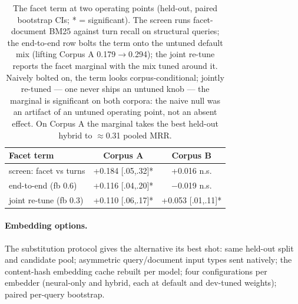 \documentclass[twocolumn,10pt]{article}
\begin{document}
\begin{table}[H]
\centering\footnotesize
\setlength{\tabcolsep}{4pt}
\begin{tabular}{@{}lcc@{}}
\toprule
\textbf{Facet term} & \textbf{Corpus A} & \textbf{Corpus B}\\
\midrule
screen: facet vs turns & +0.184 [.05,.32]* & +0.016 n.s.\\
end-to-end (fb 0.6) & +0.116 [.04,.20]* & $-$0.019 n.s.\\
joint re-tune (fb 0.3) & +0.110 [.06,.17]* & +0.053 [.01,.11]*\\
\bottomrule
\end{tabular}
\caption{The facet term at two operating points (held-out, paired bootstrap CIs; * = significant). The screen runs facet-document BM25 against turn recall on structural queries; the end-to-end row bolts the term onto the untuned default mix (lifting Corpus A 0.179$\to$0.294); the joint re-tune reports the facet marginal with the mix tuned around it. Naively bolted on, the term looks corpus-conditional; jointly re-tuned --- one never ships an untuned knob --- the marginal is significant on both corpora: the naive null was an artifact of an untuned operating point, not an absent effect. On Corpus A the marginal takes the best held-out hybrid to $\approx$0.31 pooled MRR.}
\label{tab:facet}
\end{table}

\paragraph{Embedding options.}
The substitution protocol gives the alternative its best shot: same held-out split and candidate pool; asymmetric query/document input types sent natively; the content-hash embedding cache rebuilt per model; four configurations per embedder (neural-only and hybrid, each at default and dev-tuned weights); paired per-query bootstrap.
\end{document}
